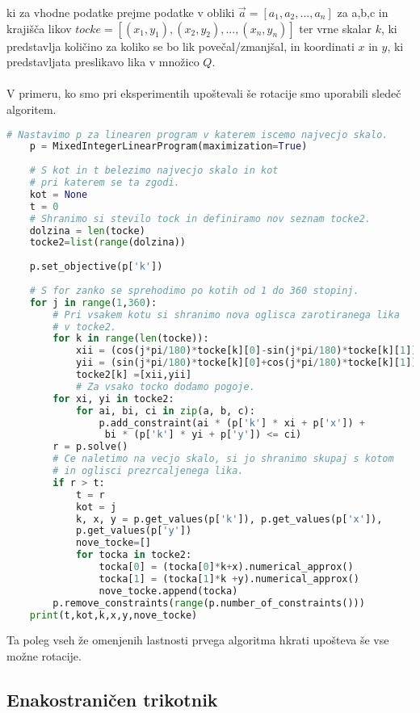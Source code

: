 \documentclass[a4paper, 12pt]{article}
\begin{document}
ki za vhodne podatke prejme podatke v obliki $\vec{a} = [a_1,a_2,...,a_n]$ za a,b,c in krajišča likov $tocke = [(x_1,y_1),(x_2,y_2),...,(x_n,y_n)]$ 
ter vrne skalar $k$, ki predstavlja količino za koliko se bo lik povečal/zmanjšal, in koordinati $x$ in $y$, ki predstavljata preslikavo lika v množico $Q$.
\\~\\
V primeru, ko smo pri eksperimentih upoštevali še rotacije smo uporabili sledeč algoritem.
\begin{lstlisting}[language=Python]
    # Nastavimo p za linearen program v katerem iscemo najvecjo skalo.
    p = MixedIntegerLinearProgram(maximization=True)
    
    # S kot in t belezimo najvecjo skalo in kot
    # pri katerem se ta zgodi.
    kot = None
    t = 0
    # Shranimo si stevilo tock in definiramo nov seznam tocke2.
    dolzina = len(tocke)
    tocke2=list(range(dolzina))
    
    p.set_objective(p['k'])
    
    # S for zanko se sprehodimo po kotih od 1 do 360 stopinj.
    for j in range(1,360):
        # Pri vsakem kotu si shranimo nova oglisca zarotiranega lika
        # v tocke2.
        for k in range(len(tocke)):
            xii = (cos(j*pi/180)*tocke[k][0]-sin(j*pi/180)*tocke[k][1])
            yii = (sin(j*pi/180)*tocke[k][0]+cos(j*pi/180)*tocke[k][1])
            tocke2[k] =[xii,yii]
            # Za vsako tocko dodamo pogoje.
        for xi, yi in tocke2:
            for ai, bi, ci in zip(a, b, c):
                p.add_constraint(ai * (p['k'] * xi + p['x']) +
                 bi * (p['k'] * yi + p['y']) <= ci)
        r = p.solve()
        # Ce naletimo na vecjo skalo, si jo shranimo skupaj s kotom
        # in oglisci prezrcaljenega lika.
        if r > t:
            t = r
            kot = j
            k, x, y = p.get_values(p['k']), p.get_values(p['x']), 
            p.get_values(p['y'])
            nove_tocke=[]
            for tocka in tocke2:
                tocka[0] = (tocka[0]*k+x).numerical_approx()
                tocka[1] = (tocka[1]*k +y).numerical_approx()
                nove_tocke.append(tocka)
        p.remove_constraints(range(p.number_of_constraints()))
    print(t,kot,k,x,y,nove_tocke)
\end{lstlisting}
Ta poleg vseh že omenjenih lastnosti prvega algoritma hkrati upošteva še vse možne rotacije.
\subsection{Enakostraničen trikotnik}
\end{document}
